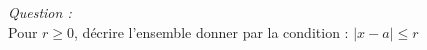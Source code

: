 \textit{Question : }\\

Pour $r\geq 0$, décrire l'ensemble donner par la condition : $\vert x - a  \vert \leq r$ 